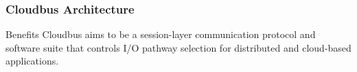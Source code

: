 \begin{frame}
	\frametitle{Cloudbus Architecture}
	\begin{block}{Benefits}
		Cloudbus aims to be a session-layer communication protocol and software suite that controls I/O pathway selection for distributed %
		and cloud-based applications. 
	\end{block}
\end{frame}